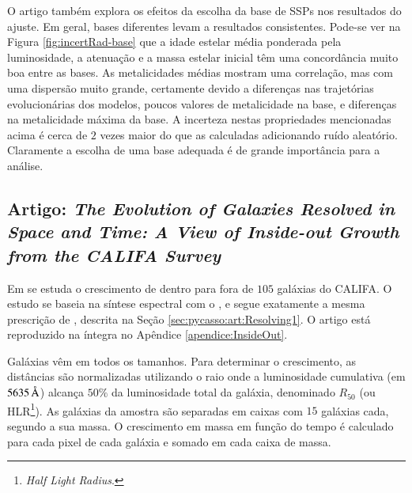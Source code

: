 O artigo também explora os efeitos da escolha da base de SSPs nos resultados do
ajuste. Em geral, bases diferentes levam a resultados consistentes.
Pode-se ver na Figura \ref{fig:incertRad-base} que a idade estelar
média ponderada pela luminosidade, a atenuação e a massa estelar inicial
têm uma concordância muito boa entre as bases. As metalicidades médias mostram
uma correlação, mas com uma dispersão muito grande, certamente devido a
diferenças nas trajetórias evolucionárias dos modelos, poucos valores
de metalicidade na base, e diferenças na metalicidade máxima da base. A
incerteza nestas propriedades mencionadas acima é cerca de $2$ vezes maior do
que as calculadas adicionando ruído aleatório. Claramente a escolha de uma base
adequada é de grande importância para a análise.



\subsection{Artigo: {\em The Evolution of Galaxies Resolved in Space and Time: A
View of Inside-out Growth from the CALIFA Survey}}
\label{sec:pycasso:art:InsideOut}

Em \citet{Perez2013} se estuda o crescimento de dentro para fora de $105$
galáxias do CALIFA. O estudo se baseia na síntese espectral com o \starlight, e
segue exatamente a mesma prescrição de \citet{CidFernandes2014}, descrita na
Seção \ref{sec:pycasso:art:Resolving1}. O artigo está reproduzido na íntegra no
Apêndice \ref{apendice:InsideOut}.

Galáxias vêm em todos os tamanhos. Para determinar o crescimento, as distâncias
são normalizadas utilizando o raio onde a luminosidade cumulativa (em
$5635\,\text{\normalfont\AA}$) alcança $50\%$ da luminosidade total da galáxia, denominado
$R_{50}$ (ou HLR\footnote{{\em Half Light Radius}.}). As galáxias da amostra são
separadas em caixas com $15$ galáxias cada, segundo a sua massa. O crescimento
em massa em função do tempo é calculado para cada pixel de cada galáxia e somado
em cada caixa de massa.

